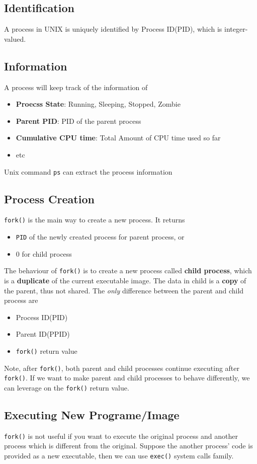 \documentclass[11pt]{article}
\theoremstyle{definition}
\begin{document}
\subsection{Identification}
A process in UNIX is uniquely identified by Process ID(PID), which is integer-valued.
\subsection{Information}
A process will keep track of the information of
\begin{itemize}[itemsep=0pt]
  \item \textbf{Proecss State}: Running, Sleeping, Stopped, Zombie
  \item \textbf{Parent PID}: PID of the parent process
  \item \textbf{Cumulative CPU time}: Total Amount of CPU time used so far
  \item etc
\end{itemize}
Unix command \texttt{ps} can extract the process information
\subsection{Process Creation}
\texttt{fork()} is the main way to create a new process. It returns
\begin{itemize}[itemsep=0pt]
  \item \texttt{PID} of the newly created process for parent process, or
  \item $0$ for child process
\end{itemize}
The behaviour of \texttt{fork()} is to create a new process called \textbf{child process}, which is a \textbf{duplicate} of the current executable image. The data in child is a \textbf{copy} of the parent, thus not shared. The \textit{only} difference between the parent and child process are
\begin{itemize}[itemsep=0pt]
\item Process ID(PID)
\item Parent ID(PPID)
\item \texttt{fork()} return value
\end{itemize}
Note, after \texttt{fork()}, both parent and child processes continue executing after \texttt{fork()}. If we want to make parent and child processes to behave differently, we can leverage on the \texttt{fork()} return value.
\subsection{Executing New Programe/Image}
\texttt{fork()} is not useful if you want to execute the original process and another process which is different from the original. Suppose the another process' code is provided as a new executable, then we can use \texttt{exec()} system calls family.\\
\end{document}
